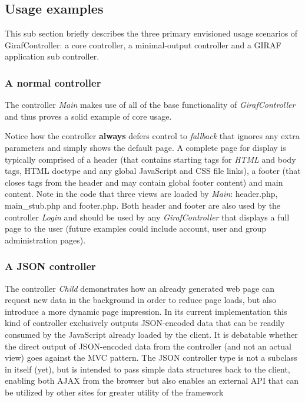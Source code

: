 \subsection{Usage examples}
This sub section briefly describes the three primary envisioned usage scenarios of GirafController: a core controller, a minimal-output controller and a GIRAF application sub controller.

\subsubsection*{A normal controller}
The controller \emph{Main} makes use of all of the base functionality of \emph{GirafController} and thus proves a solid example of core usage.



Notice how the controller \textbf{always} defers control to \emph{fallback} that ignores any extra parameters and simply shows the default page. A complete page for display is typically comprised of a header (that contains starting tags for \emph{HTML} and body tags, HTML doctype and any global JavaScript and CSS file links), a footer (that closes tags from the header and may contain global footer content) and main content. Note in the code that three views are loaded by \emph{Main}: header.php, main\_stub.php and footer.php. Both header and footer are also used by the controller \emph{Login} and should be used by any \emph{GirafController} that displays a full page to the user (future examples could include account, user and group administration pages).

\subsubsection*{A JSON controller}


The controller \emph{Child} demonstrates how an already generated web page can request new data in the background in order to reduce page loads, but also introduce a more dynamic page impression. In its current implementation this kind of controller exclusively outputs JSON-encoded data that can be readily consumed by the JavaScript already loaded by the client. It is debatable whether the direct output of JSON-encoded data from the controller (and not an actual view) goes against the MVC pattern.
The JSON controller type is not a subclass in itself (yet), but is intended to pass simple data structures back to the client, enabling both AJAX from the browser but also enables an external API that can be utilized by other sites for greater utility of the framework
\newline
